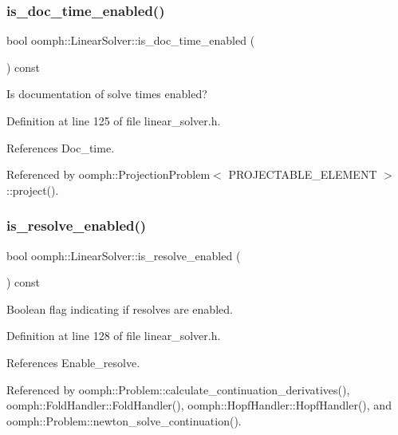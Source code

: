 \subsubsection{\texorpdfstring{is\+\_\+doc\+\_\+time\+\_\+enabled()}{is\_doc\_time\_enabled()}}
{\footnotesize\ttfamily bool oomph\+::\+Linear\+Solver\+::is\+\_\+doc\+\_\+time\+\_\+enabled (\begin{DoxyParamCaption}{ }\end{DoxyParamCaption}) const\hspace{0.3cm}{\ttfamily [inline]}}



Is documentation of solve times enabled? 



Definition at line 125 of file linear\+\_\+solver.\+h.



References Doc\+\_\+time.



Referenced by oomph\+::\+Projection\+Problem$<$ P\+R\+O\+J\+E\+C\+T\+A\+B\+L\+E\+\_\+\+E\+L\+E\+M\+E\+N\+T $>$\+::project().

\mbox{\label{classoomph_1_1LinearSolver_ae1e4d34a7e2b1537d36153f87e8a62a6}} 
\subsubsection{\texorpdfstring{is\+\_\+resolve\+\_\+enabled()}{is\_resolve\_enabled()}}
{\footnotesize\ttfamily bool oomph\+::\+Linear\+Solver\+::is\+\_\+resolve\+\_\+enabled (\begin{DoxyParamCaption}{ }\end{DoxyParamCaption}) const\hspace{0.3cm}{\ttfamily [inline]}}



Boolean flag indicating if resolves are enabled. 



Definition at line 128 of file linear\+\_\+solver.\+h.



References Enable\+\_\+resolve.



Referenced by oomph\+::\+Problem\+::calculate\+\_\+continuation\+\_\+derivatives(), oomph\+::\+Fold\+Handler\+::\+Fold\+Handler(), oomph\+::\+Hopf\+Handler\+::\+Hopf\+Handler(), and oomph\+::\+Problem\+::newton\+\_\+solve\+\_\+continuation().

